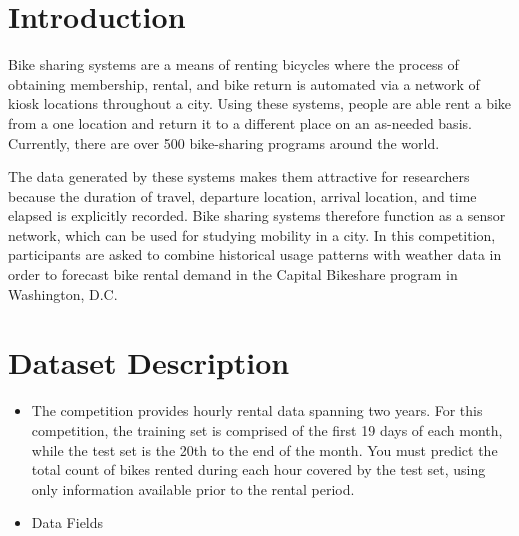 \section{Introduction}\label{sec-intro}

Bike sharing systems are a means of renting bicycles where the process of obtaining membership, rental, and bike return is automated via a network of kiosk locations throughout a city. Using these systems, people are able rent a bike from a one location and return it to a different place on an as-needed basis. Currently, there are over 500 bike-sharing programs around the world.

The data generated by these systems makes them attractive for researchers because the duration of travel, departure location, arrival location, and time elapsed is explicitly recorded. Bike sharing systems therefore function as a sensor network, which can be used for studying mobility in a city. In this competition, participants are asked to combine historical usage patterns with weather data in order to forecast bike rental demand in the Capital Bikeshare program in Washington, D.C.


\section{Dataset Description} \label{sec-preliminaries}

\begin{itemize}
  \item
  The competition provides hourly rental data spanning two years. For this competition, the training set is comprised of the first 19 days of each month, while the test set is the 20th to the end of the month. You must predict the total count of bikes rented during each hour covered by the test set, using only information available prior to the rental period.

  \item
  Data Fields
  \end{itemize} 
    
